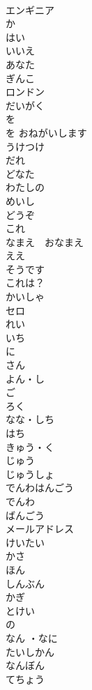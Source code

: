 \documentclass[8pt]{extreport}
\begin{document}
\begin{CJK}{UTF8}{min}
\\	エンギニア		
\\	か		
\\	はい		
\\	いいえ		
\\	あなた		
\\	ぎんこ		
\\	ロンドン		
\\	だいがく		
\\	を		
\\	を おねがいします		
\\	うけつけ		
\\	だれ		
\\	どなた		
\\	わたしの		
\\	めいし		
\\	どうぞ		
\\	これ		
\\	なまえ　おなまえ		
\\	ええ		
\\	そうです		
\\	これは？		
\\	かいしゃ		
\\	セロ 
\\	れい		
\\	いち		
\\	に		
\\	さん		
\\	よん・し		
\\	ご		
\\	ろく		
\\	なな・しち		
\\	はち		
\\	きゅう・く		
\\	じゅう		
\\	じゅうしょ		
\\	でんわはんごう		
\\	でんわ		
\\	ばんごう		
\\	メールアドレス		
\\	けいたい		
\\	かさ		
\\	ほん		
\\	しんぶん		
\\	かぎ		
\\	とけい		
\\	の		
\\	なん ・なに		
\\	たいしかん		
\\	なんぼん		
\\	てちょう		

\end{CJK}
\end{document}
